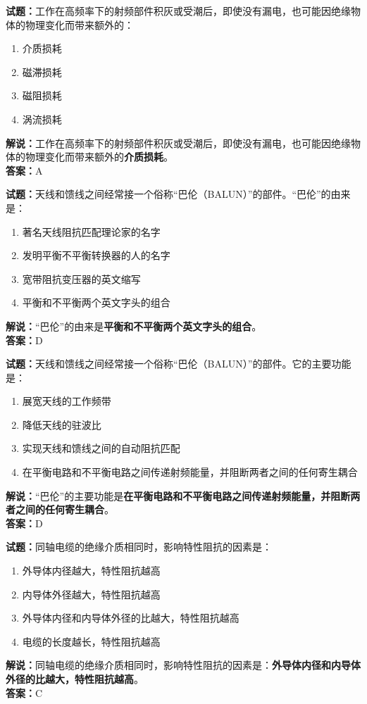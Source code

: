 \documentclass{ctexbook}
\begin{document}
\vspace{1em}

\textbf{试题：}工作在高频率下的射频部件积灰或受潮后，即使没有漏电，也可能因绝缘物体的物理变化而带来额外的：
\begin{enumerate}[leftmargin=3em]
  \item 介质损耗
  \item 磁滞损耗
  \item 磁阻损耗
  \item 涡流损耗
\end{enumerate}
\noindent\textbf{解说：}工作在高频率下的射频部件积灰或受潮后，即使没有漏电，也可能因绝缘物体的物理变化而带来额外的\textbf{介质损耗}。\\\noindent\textbf{答案：}A

\vspace{1em}

\textbf{试题：}天线和馈线之间经常接一个俗称“巴伦（BALUN）”的部件。“巴伦”的由来是：
\begin{enumerate}[leftmargin=3em]
  \item 著名天线阻抗匹配理论家的名字
  \item 发明平衡不平衡转换器的人的名字
  \item 宽带阻抗变压器的英文缩写
  \item 平衡和不平衡两个英文字头的组合
\end{enumerate}
\noindent\textbf{解说：}“巴伦”的由来是\textbf{平衡和不平衡两个英文字头的组合}。\\\noindent\textbf{答案：}D

\vspace{1em}

\textbf{试题：}天线和馈线之间经常接一个俗称“巴伦（BALUN）”的部件。它的主要功能是：
\begin{enumerate}[leftmargin=3em]
  \item 展宽天线的工作频带
  \item 降低天线的驻波比
  \item 实现天线和馈线之间的自动阻抗匹配
  \item 在平衡电路和不平衡电路之间传递射频能量，并阻断两者之间的任何寄生耦合
\end{enumerate}
\noindent\textbf{解说：}“巴伦”的主要功能是\textbf{在平衡电路和不平衡电路之间传递射频能量，并阻断两者之间的任何寄生耦合}。\\\noindent\textbf{答案：}D

\vspace{1em}

\textbf{试题：}同轴电缆的绝缘介质相同时，影响特性阻抗的因素是：
\begin{enumerate}[leftmargin=3em]
  \item 外导体内径越大，特性阻抗越高
  \item 内导体外径越大，特性阻抗越高
  \item 外导体内径和内导体外径的比越大，特性阻抗越高
  \item 电缆的长度越长，特性阻抗越高
\end{enumerate}
\noindent\textbf{解说：}同轴电缆的绝缘介质相同时，影响特性阻抗的因素是：\textbf{外导体内径和内导体外径的比越大，特性阻抗越高}。\\\noindent\textbf{答案：}C
\end{document}
